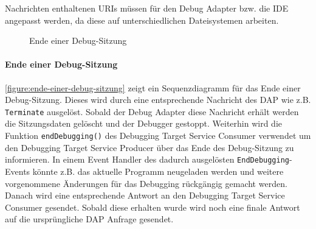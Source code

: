 Nachrichten enthaltenen URIs müssen für den Debug Adapter bzw. die IDE angepasst werden, da diese auf unterschiedlichen Dateisystemen arbeiten.

\begin{figure}[tbp]
    \centering
    \caption{Ende einer Debug-Sitzung}
    \label{figure:ende-einer-debug-sitzung}
\end{figure}

\paragraph{Ende einer Debug-Sitzung} \autoref{figure:ende-einer-debug-sitzung} zeigt ein Sequenzdiagramm für das Ende einer Debug-Sitzung. Dieses wird durch eine entsprechende Nachricht des \ac{DAP} wie z.B. \texttt{Terminate} ausgelöst. Sobald der Debug Adapter diese Nachricht erhält werden die Sitzungsdaten gelöscht und der Debugger gestoppt. Weiterhin wird die Funktion \texttt{endDebugging()} des Debugging Target Service Consumer verwendet um den Debugging Target Service Producer über das Ende des Debug-Sitzung zu informieren. In einem Event Handler des dadurch ausgelösten \texttt{EndDebugging}-Events könnte z.B. das aktuelle Programm neugeladen werden und weitere vorgenommene Änderungen für das Debugging rückgängig gemacht werden. Danach wird eine entsprechende Antwort an den Debugging Target Service Consumer gesendet. Sobald diese erhalten wurde wird noch eine finale Antwort auf die ursprüngliche \ac{DAP} Anfrage gesendet.

